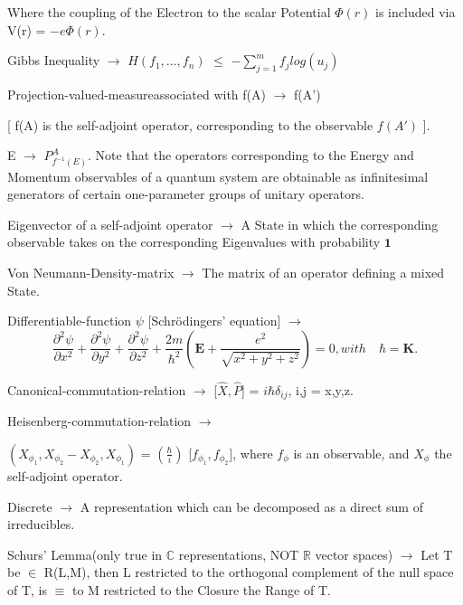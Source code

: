 \documentclass[a4paper, 10pt, onepage]{elegantbook}
\begin{document}
{Where the coupling of the Electron to the scalar Potential $\Phi(r)$ is included via V(r) = ${- e \Phi(r)}$.  

Gibbs Inequality $\longrightarrow$ $H(f_1,...,f_n)$ $\leq$ ${- \sum_{j=1}^{m} f_j log(u_j)}$ 
 
Projection-valued-measureassociated with f(A) $\longrightarrow$ f(A')  
  
[ f(A) is the self-adjoint operator, corresponding to the observable $f(A')$ ]. 

E $\rightarrow$ $P^{A}_{f^{-1}(E)}$. Note that the operators corresponding to the Energy and Momentum 
observables of a
quantum system are obtainable as infinitesimal generators of certain one-parameter groups of unitary 
operators. 
                                                                        
Eigenvector of a self-adjoint operator $\longrightarrow$ A State in which the corresponding 
observable takes
on the corresponding Eigenvalues with probability $\mathbf 1$ 
 
Von Neumann-Density-matrix $\longrightarrow$ The matrix of an 
operator defining a mixed State.  
  
Differentiable-function $\psi$ [Schr\"odingers' equation] $\longrightarrow$
\begin{equation}
\frac{\partial^2 \psi}{\partial x^2} + \frac{\partial^2 \psi}{\partial y^2} + \frac{\partial^2 \psi}{\partial z^2} + 
\frac{2m}{\hbar^2} \left(\mathbf E + \frac{e^2}{\sqrt{x^2 + y^2 + z^2}}\right) = 0, with \quad \hbar = \mathbf K.
\end{equation}

Canonical-commutation-relation $\longrightarrow$ [$\hat X, \hat P$] = $i \hbar 
\delta_{ij}$, i,j = x,y,z.  

Heisenberg-commutation-relation $\longrightarrow$  

$(X_{\phi_1}, X_{\phi_2} - X_{\phi_2}, X_{\phi_1})$ = $(\frac{\hbar}{i})$ [$f_{\phi_1}, f_{\phi_2}]$,
where $f_\phi$ is an observable, and $X_\phi$ the self-adjoint operator.  

  
Discrete $\longrightarrow$ A representation which can be decomposed as a direct sum of irreducibles. 
  
Schurs' Lemma(only true in $\mathbb C$ representations, NOT $\mathbb R$ vector spaces) 
$\longrightarrow$ Let T be $\in$ R(L,M), then L restricted to the orthogonal complement of the null space
of T, is $\equiv$ to M restricted to the Closure the Range of T.  
  
}
\end{document}

